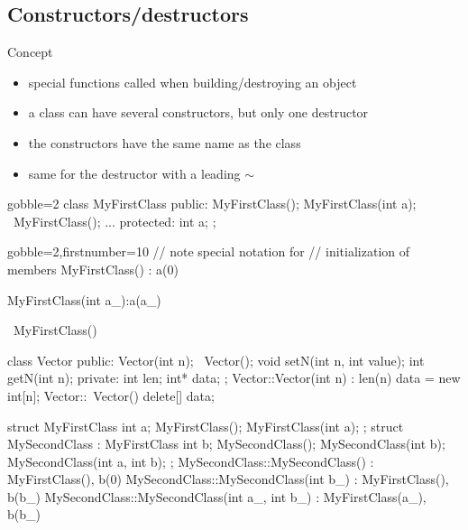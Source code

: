 \subsection[construct]{Constructors/destructors}

\begin{frame}[fragile]
  \begin{block}{Concept}
    \begin{itemize}
    \item special functions called when building/destroying an object
    \item a class can have several constructors, but only one destructor
    \item the constructors have the same name as the class
    \item same for the destructor with a leading $\sim$
    \end{itemize}
  \end{block}
  \begin{multicols}{2}
    \begin{cppcode*}{gobble=2}
      class MyFirstClass {
      public:
        MyFirstClass();
        MyFirstClass(int a);
        ~MyFirstClass();
        ...
      protected:
        int a;
      };
    \end{cppcode*}
    \columnbreak
    \begin{cppcode*}{gobble=2,firstnumber=10}
      // note special notation for
      // initialization of members
      MyFirstClass() : a(0) {}

      MyFirstClass(int a_):a(a_) {}

      ~MyFirstClass() {}
    \end{cppcode*}
  \end{multicols}
\end{frame}


\begin{frame}[fragile]
  \begin{cppcode}
    class Vector {
    public:
      Vector(int n);
      ~Vector();
      void setN(int n, int value);
      int getN(int n);
    private:
      int len;
      int* data;
    };
    Vector::Vector(int n) : len(n) {
      data = new int[n];
    }
    Vector::~Vector() {
      delete[] data;
    }
  \end{cppcode}
\end{frame}

\begin{frame}[fragile]
  \begin{cppcode}
    struct MyFirstClass {
      int a;
      MyFirstClass();
      MyFirstClass(int a);
    };
    struct MySecondClass : MyFirstClass {
      int b;
      MySecondClass();
      MySecondClass(int b);
      MySecondClass(int a, int b);
    };
    MySecondClass::MySecondClass() : MyFirstClass(), b(0) {}
    MySecondClass::MySecondClass(int b_)
      : MyFirstClass(), b(b_) {}
    MySecondClass::MySecondClass(int a_, int b_)
      : MyFirstClass(a_), b(b_) {}
  \end{cppcode}
\end{frame}

